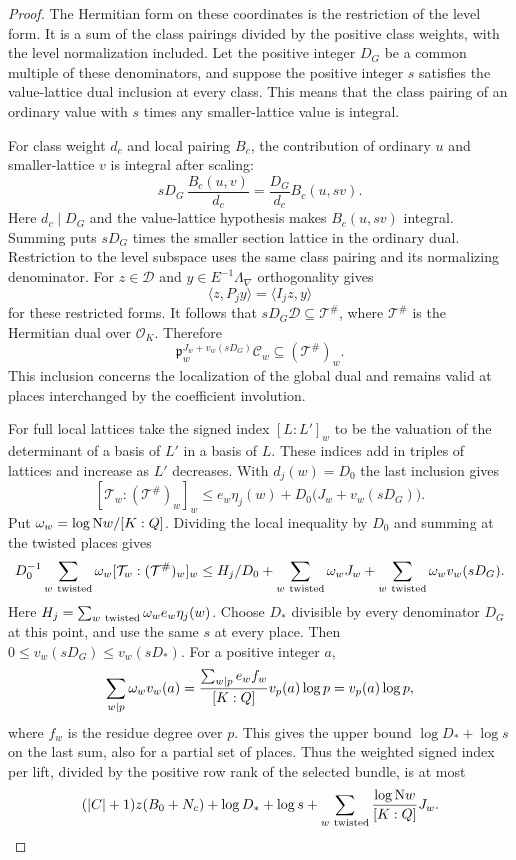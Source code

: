 \begin{proof}
The Hermitian form on these coordinates is the restriction of the
level form. It is a sum of the class pairings divided by
the positive class weights, with the level normalization included.
Let the positive integer \(D_G\) be a common multiple of
these denominators, and suppose the positive integer \(s\)
satisfies the value-lattice
dual inclusion at every class. This means that the class pairing
of an ordinary value with \(s\) times any smaller-lattice
value is integral.

For class weight \(d_c\) and local pairing \(B_c\), the contribution of ordinary \(u\) and smaller-lattice \(v\) is integral after scaling:
\[
 sD_G\,\frac{B_c(u,v)}{d_c}
     =\frac{D_G}{d_c}B_c(u,sv).
\]
Here \(d_c\mid D_G\) and the value-lattice hypothesis makes \(B_c(u,sv)\) integral. Summing puts \(sD_G\) times the smaller section lattice in the ordinary dual. Restriction to the level subspace
uses the same class pairing and its normalizing denominator.
For \(z\in\mathcal D\) and \(y\in E^{-1}\Lambda_\nabla\)
orthogonality gives
\[
 \langle z,P_jy\rangle=\langle I_jz,y\rangle
\]
for these restricted forms. It follows that
\(sD_G\mathcal D\subseteq\mathcal T^\#\), where
\(\mathcal T^\#\) is the Hermitian dual over \(\mathcal O_K\).
Therefore
\[
 \mathfrak p_w^{J_w+v_w(sD_G)}\mathcal C_w \subseteq(\mathcal T^\#)_w.
\]
This inclusion concerns the
localization of the global dual and remains valid at places
interchanged by the coefficient involution.

For full local lattices take the signed index \([L:L']_w\)
to be the valuation of the determinant of a basis of \(L'\)
in a basis of \(L\). These indices add in triples of lattices
and increase as \(L'\) decreases. With \(d_j(w)=D_0\) the last
inclusion gives
\[
 [\mathcal T_w:(\mathcal T^\#)_w]_w
 \le
  e_w\eta_j(w)+D_0\bigl(J_w+v_w(sD_G)\bigr).
\]
Put \(\omega_w=\log\mathrm Nw/[K:Q]\). Dividing the
local inequality by \(D_0\) and summing at the twisted places
gives
\[
 D_0^{-1}\sum_{w\ {\rm twisted}}\omega_w
        [\mathcal T_w:(\mathcal T^\#)_w]_w
 \le H_j/D_0
     +\sum_{w\ {\rm twisted}}\omega_w J_w
     +\sum_{w\ {\rm twisted}}\omega_w v_w(sD_G).
\]
Here \(H_j=\sum_{w\ {\rm twisted}}\omega_w e_w\eta_j(w)\).
Choose \(D_*\) divisible by every denominator \(D_G\) at
this point, and use the same \(s\) at every place. Then
\(0\le v_w(sD_G)\le v_w(sD_*)\). For a positive integer \(a\),
\[
 \sum_{w\mid p}\omega_w v_w(a)
   =\frac{\sum_{w\mid p}e_w f_w}{[K:Q]}v_p(a)\log p
   =v_p(a)\log p,
\]
where \(f_w\) is the residue degree over \(p\).
This gives the upper bound \(\log D_*+\log s\) on the
last sum, also for a partial set of places. Thus the weighted signed index per lift,
divided by the positive row rank of the selected bundle,
is at most
\[
        (|C|+1)z(B_0+N_c)+\log D_*+\log s
        +\sum_{w\ {\rm twisted}}\frac{\log\mathrm Nw}{[K:Q]}J_w .
\]


\end{proof}
